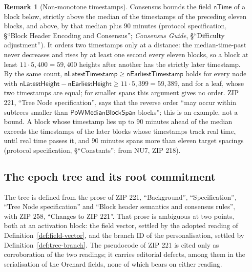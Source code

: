\documentclass[11pt,a4paper]{article}
\theoremstyle{definition}
\newtheorem{remark}[theorem]{Remark}
\begin{document}
\begin{remark}[Non-monotone timestamps]\label{rem:timestamps}
Consensus bounds the field $\mathsf{nTime}$ of a block below, strictly above
the median of the timestamps of the preceding eleven blocks, and above, by
that median plus $90$ minutes (protocol specification, \S``Block Header
Encoding and Consensus''; \emph{Consensus Guide}, \S``Difficulty adjustment''). It orders two timestamps only at a distance: the
median-time-past never decreases and rises by at least one second every
eleven blocks, so a block at least $11 \cdot 5{,}400 = 59{,}400$ heights
after another has the strictly later timestamp. By the same count,
$\mathsf{nLatestTimestamp} \ge \mathsf{nEarliestTimestamp}$ holds for every node
with $\mathsf{nLatestHeight} - \mathsf{nEarliestHeight} \ge 11 \cdot 5{,}399 =
59{,}389$, and for a leaf, whose two timestamps are equal; for smaller spans
this argument gives no order. ZIP 221, ``Tree Node specification'', says that
the reverse order ``may occur within subtrees smaller than
$\mathsf{PoWMedianBlockSpan}$ blocks''; this is an
example, not a bound. A block whose timestamp lies up to $90$ minutes ahead
of the median exceeds the timestamps of the later blocks whose timestamps
track real time, until real time passes it, and $90$ minutes spans more than
eleven target spacings (protocol specification, \S``Constants''; from NU7,
ZIP 218).
\end{remark}

\subsection{The epoch tree and its root commitment}\label{sec:history-tree}

The tree is defined from the prose of ZIP 221, ``Background'',
``Specification'', ``Tree Node specification'' and ``Block header semantics
and consensus rules'', with ZIP 258, ``Changes to ZIP 221''. That prose is
ambiguous at two points, both at an activation block: the field vector,
settled by the adopted reading of Definition~\ref{def:field-vector}, and the
branch ID of the personalisation, settled by
Definition~\ref{def:tree-branch}. The pseudocode of ZIP 221 is cited only as
corroboration of the two readings; it carries editorial defects, among them
in the serialisation of the Orchard fields, none of which bears on either
reading.
\end{document}
